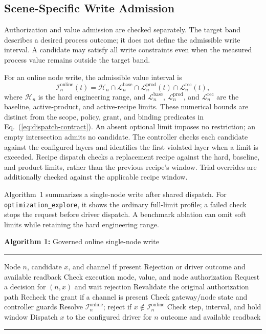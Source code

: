 \documentclass[journal]{IEEEtran}
\begin{document}
\subsection{Scene-Specific Write Admission}
\label{sec:governed}
Authorization and value admission are checked separately. The target band describes a desired
process outcome; it does not define the admissible write interval. A candidate may
satisfy all write constraints even when the measured process value remains outside
the target band.

For an online node write, the admissible value interval is
\begin{equation}
\mathcal{I}^{\mathrm{online}}_n(t)=
\mathcal{H}_n\cap\mathcal{L}^{\mathrm{base}}_n\cap\mathcal{L}^{\mathrm{prod}}_n(t)\cap\mathcal{L}^{\mathrm{rec}}_n(t),
\label{eq:admission}
\end{equation}
where $\mathcal{H}_n$ is the hard engineering range, and
$\mathcal{L}^{\mathrm{base}}_n$, $\mathcal{L}^{\mathrm{prod}}_n$, and
$\mathcal{L}^{\mathrm{rec}}_n$ are the baseline, active-product, and
active-recipe limits. These numerical bounds are distinct from the scope,
policy, grant, and binding predicates in Eq.~(\ref{eq:dispatch-contract}).
An absent optional limit imposes no restriction; an empty intersection admits no
candidate. The controller checks each candidate against the configured layers
and identifies the first violated layer when a limit is exceeded. Recipe dispatch
checks a replacement recipe against the hard, baseline, and product limits,
rather than the previous recipe's window. Trial overrides are additionally checked against
the applicable recipe window.

Algorithm~1 summarizes a single-node write after shared dispatch. For
\texttt{optimization\_explore}, it shows the ordinary full-limit profile; a failed
check stops the request before driver dispatch. A benchmark ablation can
omit soft limits while retaining the hard engineering range.

\par\medskip
\noindent\begin{minipage}{\columnwidth}
\small
\noindent\textbf{Algorithm 1:} Governed online single-node write
\par\kern2pt\hrule\kern2pt
\begin{algorithmic}[1]
\Require Node $n$, candidate $x$, and channel if present
\Ensure Rejection or driver outcome and available readback
\State Check execution mode, value, and node authorization
  \State Request a decision for $(n,x)$ and wait
    \State \Return rejection
  \EndIf
  \State Revalidate the original authorization path
\EndIf
\State Recheck the grant if a channel is present
\State Check gateway/node state and controller guards
\State Resolve $\mathcal{I}^{\mathrm{online}}_n$; reject if $x\notin\mathcal{I}^{\mathrm{online}}_n$
  \State Check step, interval, and hold window
\EndIf
\State Dispatch $x$ to the configured driver for $n$
\State \Return outcome and available readback
\end{algorithmic}
\kern2pt\hrule
\end{minipage}
\par\medskip
\end{document}

